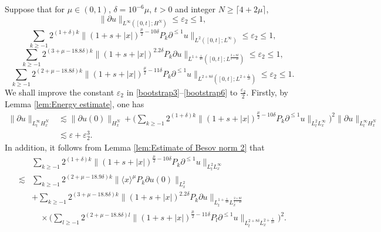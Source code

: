 \documentclass[11pt,twoside]{article}
\def\f{\frac}
\def\p{\partial}
\def\ls{\lesssim}
\newcommand{\w}[1]{\langle {#1} \rangle}
\theoremstyle{plain}
\theoremstyle{definition}
\numberwithin{equation}{section}
\begin{document}
Suppose that for $\mu\in(0,1)$, $\delta=10^{-6}\mu$, $t>0$ and integer $N\ge \lceil4+2\mu\rceil$,
\begin{equation}\label{bootstrap3}
\|\p u\|_{L^\infty([0,t];H^N)}\le \varepsilon_2\le1,	
\end{equation}
\begin{equation}\label{bootstrap4}
\sum_{k\ge-1}2^{(1+\delta) k}\|(1+s+|x|)^{\f{\mu}{2}-10\delta}P_k\p^{\le 1} u\|_{L^{2}([0,t];L^\infty)}\le \varepsilon_2\le1,
\end{equation}
\begin{equation}\label{bootstrap5}
\sum_{k\ge-1}2^{(3 +\mu -18.8\delta) k} \|(1+s+|x|)^{2.2\delta}P_{k}\p u\|_{L^{1+\f{1}{4\delta}}([0,t];L^{\f{2+8\delta}{1-4\delta}})}\le \varepsilon_2\le1,
\end{equation}
\begin{equation}\label{bootstrap6}
	\sum_{k\ge-1}2^{(2 +\mu -18.8\delta) k} \|(1+s+|x|)^{\f{\mu}{2}-11\delta}P_{k}\p^{\le 1} u\|_{L^{2+8\delta}([0,t];L^{2+\f{1}{2\delta}})}\le \varepsilon_2\le1.
\end{equation}
We shall improve the constant $\varepsilon_2$ in \eqref{bootstrap3}--\eqref{bootstrap6} to $\f{\varepsilon_2}{2}$.
Firstly, by Lemma \ref{lem:Energy estimate}, one has
\begin{equation}\label{improve21}
\begin{split}
\|\p u\|_{L^\infty_tH^N_x}
&\ls \|\p u(0)\|_{H^N_x}+\big(\sum_{k\ge-1}
2^{(1+\delta) k}\|(1+s+|x|)^{\f{\mu}{2}-10\delta}P_k\p^{\le 1} u\|_{L^{2}_t L^\infty_x}\big)^2\|\p u\|_{L^\infty_tH^N_x}\\
&\ls \varepsilon +\varepsilon_2^3.
\end{split}	
\end{equation}
In addition, it follows from Lemma \ref{lem:Estimate of Besov norm 2} that
\begin{equation}\label{improve22}
	\begin{split}
		&\sum_{k\ge -1}2^{(1+\delta) k}\|(1+s+|x|)^{\f{\mu}{2}-10\delta}P_k\p^{\le 1} u\|_{L^{2}_tL^\infty_x}\\
		\ls&
		\sum_{k\ge -1}2^{(2 +\mu -18.9\delta) k}\|\w{x}^{\mu}P_k\partial u(0)\|_{L^2_x}\\
		&+
		\sum_{k\ge -1}2^{(3 +\mu -18.8\delta) k}\|(1+s+|x|)^{2.2\delta} P_{k}\p u\|_{L_t^{1+\f{1}{4\delta}}L^{\f{2+8\delta}{1-4\delta}}_x}\\
		&\quad\times
		\big(\sum_{l\ge-1}2^{(2 +\mu-18.8\delta) l} \|(1+s+|x|)^{\f{\mu}{2}-11\delta}P_{l}\p^{\le 1} u\|_{L_t^{2+8\delta}L^{2+\f{1}{2\delta}}_x}\big)^2.
	\end{split}
\end{equation}
\end{document}
